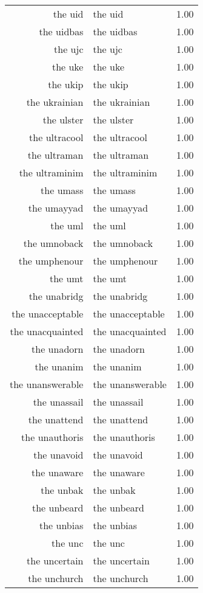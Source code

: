 \begin{table}[ht]
\begin{tabular}{rlr}
  the uid & the uid & 1.00 \\ 
  the uidbas & the uidbas & 1.00 \\ 
  the ujc & the ujc & 1.00 \\ 
  the uke & the uke & 1.00 \\ 
  the ukip & the ukip & 1.00 \\ 
  the ukrainian & the ukrainian & 1.00 \\ 
  the ulster & the ulster & 1.00 \\ 
  the ultracool & the ultracool & 1.00 \\ 
  the ultraman & the ultraman & 1.00 \\ 
  the ultraminim & the ultraminim & 1.00 \\ 
  the umass & the umass & 1.00 \\ 
  the umayyad & the umayyad & 1.00 \\ 
  the uml & the uml & 1.00 \\ 
  the umnoback & the umnoback & 1.00 \\ 
  the umphenour & the umphenour & 1.00 \\ 
  the umt & the umt & 1.00 \\ 
  the unabridg & the unabridg & 1.00 \\ 
  the unacceptable & the unacceptable & 1.00 \\ 
  the unacquainted & the unacquainted & 1.00 \\ 
  the unadorn & the unadorn & 1.00 \\ 
  the unanim & the unanim & 1.00 \\ 
  the unanswerable & the unanswerable & 1.00 \\ 
  the unassail & the unassail & 1.00 \\ 
  the unattend & the unattend & 1.00 \\ 
  the unauthoris & the unauthoris & 1.00 \\ 
  the unavoid & the unavoid & 1.00 \\ 
  the unaware & the unaware & 1.00 \\ 
  the unbak & the unbak & 1.00 \\ 
  the unbeard & the unbeard & 1.00 \\ 
  the unbias & the unbias & 1.00 \\ 
  the unc & the unc & 1.00 \\ 
  the uncertain & the uncertain & 1.00 \\ 
  the unchurch & the unchurch & 1.00 \\ 

\end{tabular}
\end{table}
